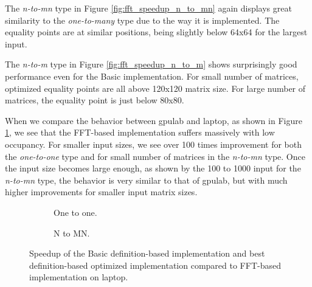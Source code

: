 The \textit{n-to-mn} type in Figure \ref{fig:fft_speedup_n_to_mn} again displays great similarity to the \textit{one-to-many} type due to the way it is implemented. The equality points are at similar positions, being slightly below 64x64 for the largest input.

The \textit{n-to-m} type in Figure \ref{fig:fft_speedup_n_to_m} shows surprisingly good performance even for the Basic implementation. For small number of matrices, optimized equality points are all above 120x120 matrix size. For large number of matrices, the equality point is just below 80x80.


When we compare the behavior between gpulab and laptop, as shown in Figure \ref{fig:fft_speedup_laptop}, we see that the FFT-based implementation suffers massively with low occupancy. For smaller input sizes, we see over 100 times improvement for both the \textit{one-to-one} type and for small number of matrices in the \textit{n-to-mn} type. Once the input size becomes large enough, as shown by the 100 to 1000 input for the \textit{n-to-mn} type, the behavior  is very similar to that of gpulab, but with much higher improvements for smaller input matrix sizes.


\begin{figure}[ht]
	\centering	
	\begin{subfigure}{0.4\textwidth}
		\centering
		\def\svgwidth{\textwidth}
		
		\caption{One to one.}
	\end{subfigure}
	\begin{subfigure}{0.4\textwidth}
		\centering
		\def\svgwidth{\textwidth}
		
		\caption{N to MN.}
	\end{subfigure}
	\caption{Speedup of the Basic definition-based implementation and best definition-based optimized implementation compared to FFT-based implementation on laptop.}
	\label{fig:fft_speedup_laptop}
\end{figure}


